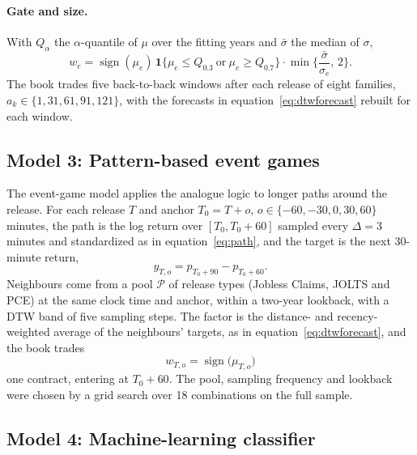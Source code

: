 \paragraph{Gate and size.} With $Q_\alpha$ the $\alpha$-quantile of $\mu$ over the fitting years and
$\bar\sigma$ the median of $\sigma$,
\begin{equation}\label{eq:dtwtrade}
  w_e = \operatorname{sign}(\mu_e)\,\mathbf{1}\big\{\mu_e\le Q_{0.3}\ \text{or}\ \mu_e\ge Q_{0.7}\big\}
  \cdot \min\Big\{\frac{\bar\sigma}{\sigma_e},\,2\Big\}.
\end{equation}
The book trades five back-to-back windows after each release of eight families, $a_k\in\{1,31,61,
91,121\}$, with the forecasts in equation~\eqref{eq:dtwforecast} rebuilt for each window.

\subsection{Model 3: Pattern-based event games}\label{sec:model_games}

The event-game model applies the analogue logic to longer paths around the release. For each
release $T$ and anchor $T_0=T+o$, $o\in\{-60,-30,0,30,60\}$ minutes, the path is the log return
over $[T_0,T_0+60]$ sampled every $\Delta=3$ minutes and standardized as in
equation~\eqref{eq:path}, and the target is the next 30-minute return,
\begin{equation}\label{eq:game}
  y_{T,o} = p_{T_0+90}-p_{T_0+60}.
\end{equation}
Neighbours come from a pool $\mathcal{P}$ of release types (Jobless Claims, JOLTS and PCE) at the
same clock time and anchor, within a two-year lookback, with a DTW band of five sampling steps. The
factor is the distance- and recency-weighted average of the neighbours' targets, as in
equation~\eqref{eq:dtwforecast}, and the book trades
\begin{equation}\label{eq:gametrade}
  w_{T,o}=\operatorname{sign}\big(\mu_{T,o}\big)
\end{equation}
one contract, entering at $T_0+60$. The pool, sampling frequency and lookback were chosen by a grid
search over 18 combinations on the full sample.

\subsection{Model 4: Machine-learning classifier}\label{sec:model_ml}

